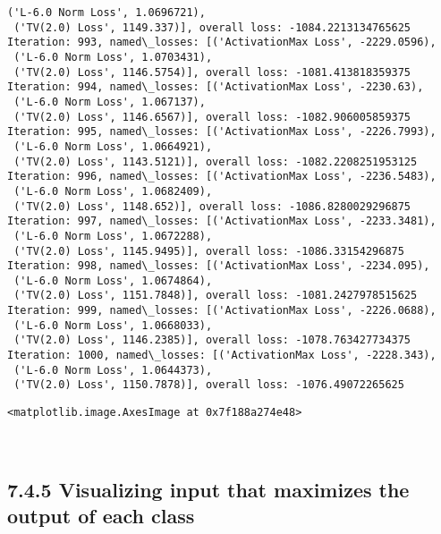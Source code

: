 \documentclass[10pt]{article}
\makeatletter
\newcommand{\boxspacing}{\kern\kvtcb@left@rule\kern\kvtcb@boxsep}
\newcommand{\prompt}[4]{
        \ttfamily\llap{{\color{#2}[#3]:\hspace{3pt}#4}}\vspace{-\baselineskip}
    }
\makeatother
\begin{document}
\begin{Verbatim}[commandchars=\\\{\}]
 ('L-6.0 Norm Loss', 1.0696721),
 ('TV(2.0) Loss', 1149.337)], overall loss: -1084.2213134765625
Iteration: 993, named\_losses: [('ActivationMax Loss', -2229.0596),
 ('L-6.0 Norm Loss', 1.0703431),
 ('TV(2.0) Loss', 1146.5754)], overall loss: -1081.413818359375
Iteration: 994, named\_losses: [('ActivationMax Loss', -2230.63),
 ('L-6.0 Norm Loss', 1.067137),
 ('TV(2.0) Loss', 1146.6567)], overall loss: -1082.906005859375
Iteration: 995, named\_losses: [('ActivationMax Loss', -2226.7993),
 ('L-6.0 Norm Loss', 1.0664921),
 ('TV(2.0) Loss', 1143.5121)], overall loss: -1082.2208251953125
Iteration: 996, named\_losses: [('ActivationMax Loss', -2236.5483),
 ('L-6.0 Norm Loss', 1.0682409),
 ('TV(2.0) Loss', 1148.652)], overall loss: -1086.8280029296875
Iteration: 997, named\_losses: [('ActivationMax Loss', -2233.3481),
 ('L-6.0 Norm Loss', 1.0672288),
 ('TV(2.0) Loss', 1145.9495)], overall loss: -1086.33154296875
Iteration: 998, named\_losses: [('ActivationMax Loss', -2234.095),
 ('L-6.0 Norm Loss', 1.0674864),
 ('TV(2.0) Loss', 1151.7848)], overall loss: -1081.2427978515625
Iteration: 999, named\_losses: [('ActivationMax Loss', -2226.0688),
 ('L-6.0 Norm Loss', 1.0668033),
 ('TV(2.0) Loss', 1146.2385)], overall loss: -1078.763427734375
Iteration: 1000, named\_losses: [('ActivationMax Loss', -2228.343),
 ('L-6.0 Norm Loss', 1.0644373),
 ('TV(2.0) Loss', 1150.7878)], overall loss: -1076.49072265625
    \end{Verbatim}

            \begin{tcolorbox}[breakable, size=fbox, boxrule=.5pt, pad at break*=1mm, opacityfill=0]
\prompt{Out}{outcolor}{ }{\boxspacing}
\begin{Verbatim}[commandchars=\\\{\}]
<matplotlib.image.AxesImage at 0x7f188a274e48>
\end{Verbatim}
\end{tcolorbox}
        
    \begin{center}
    \end{center}
    { \hspace*{\fill} \\}
    
    \hypertarget{visualizing-input-that-maximizes-the-output-of-each-class}{%
\subsection*{7.4.5 Visualizing input that maximizes the output of each
class}\label{visualizing-input-that-maximizes-the-output-of-each-class}}
\end{document}
